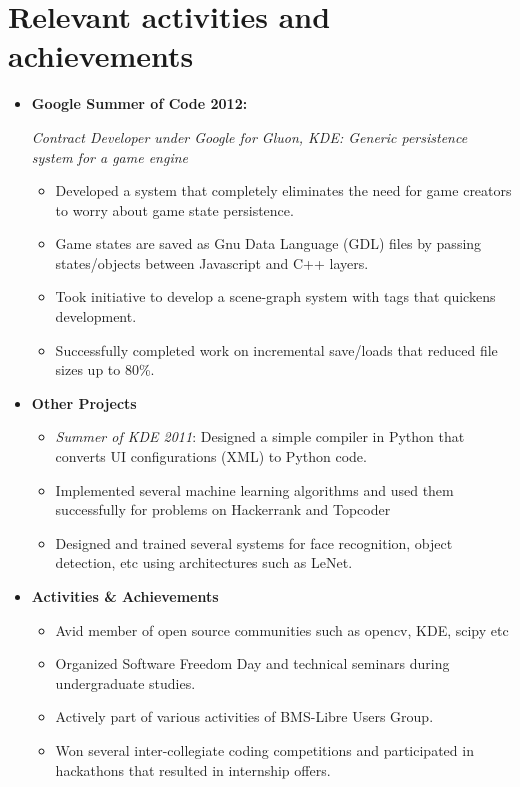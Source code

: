 \documentclass[10pt,letterpaper,sans]{moderncv}        %
\begin{document}
\section{Relevant activities and achievements}
\begin{itemize}
\item \textbf{Google Summer of Code 2012:}
\small{
\textit{Contract Developer under Google for Gluon, KDE: Generic persistence system for a game engine}
\begin{itemize}
\item Developed a system that completely eliminates the need for game creators to worry about game state persistence.
\item Game states are saved as Gnu Data Language (GDL) files by passing states/objects between Javascript and C++ layers.
\item Took initiative to develop a scene-graph system with tags that quickens development. 
\item Successfully completed work on incremental save/loads that reduced file sizes up to 80\%.
\end{itemize}
}
\item \textbf{Other Projects}
\begin{small}
\begin{itemize}
\item \textit{Summer of KDE 2011}: Designed a simple compiler in Python that converts UI configurations (XML) to Python code.
\item Implemented several machine learning algorithms and used them successfully for problems on Hackerrank and Topcoder
\item Designed and trained several systems for face recognition, object detection, etc using architectures such as LeNet.
\end{itemize}
\end{small}
\item \textbf{Activities \& Achievements}
\begin{small}
\begin{itemize}
\item Avid member of open source communities such as opencv, KDE, scipy etc
\item Organized Software Freedom Day and technical seminars during undergraduate studies. 
\item Actively part of various activities of BMS-Libre Users Group.
\item Won several inter-collegiate coding competitions and participated in hackathons that resulted in internship offers.
\end{itemize}
\end{small}
\end{itemize}
\end{document}
